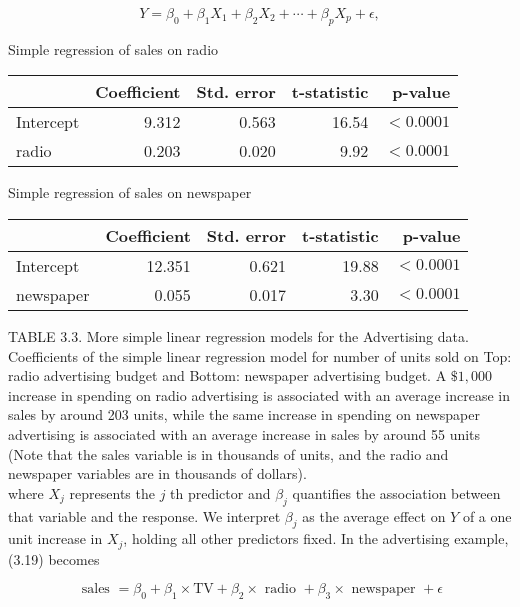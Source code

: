 \documentclass[10pt]{article}
\begin{document}
\begin{equation*}
Y=\beta_{0}+\beta_{1} X_{1}+\beta_{2} X_{2}+\cdots+\beta_{p} X_{p}+\epsilon, \tag{3.19}
\end{equation*}


Simple regression of sales on radio

\begin{center}
\begin{tabular}{l|rrrr}
\hline
 & Coefficient & Std. error & t-statistic & p-value \\
\hline
Intercept & 9.312 & 0.563 & 16.54 & $<0.0001$ \\
radio & 0.203 & 0.020 & 9.92 & $<0.0001$ \\
\hline
\end{tabular}
\end{center}

Simple regression of sales on newspaper

\begin{center}
\begin{tabular}{l|rrrr}
\hline
 & Coefficient & Std. error & t-statistic & p-value \\
\hline
Intercept & 12.351 & 0.621 & 19.88 & $<0.0001$ \\
newspaper & 0.055 & 0.017 & 3.30 & $<0.0001$ \\
\hline
\end{tabular}
\end{center}

TABLE 3.3. More simple linear regression models for the Advertising data. Coefficients of the simple linear regression model for number of units sold on Top: radio advertising budget and Bottom: newspaper advertising budget. A $\$ 1,000$ increase in spending on radio advertising is associated with an average increase in sales by around 203 units, while the same increase in spending on newspaper advertising is associated with an average increase in sales by around 55 units (Note that the sales variable is in thousands of units, and the radio and newspaper variables are in thousands of dollars).\\
where $X_{j}$ represents the $j$ th predictor and $\beta_{j}$ quantifies the association between that variable and the response. We interpret $\beta_{j}$ as the average effect on $Y$ of a one unit increase in $X_{j}$, holding all other predictors fixed. In the advertising example, (3.19) becomes


\begin{equation*}
\text { sales }=\beta_{0}+\beta_{1} \times \mathrm{TV}+\beta_{2} \times \text { radio }+\beta_{3} \times \text { newspaper }+\epsilon \tag{3.20}
\end{equation*}
\end{document}
